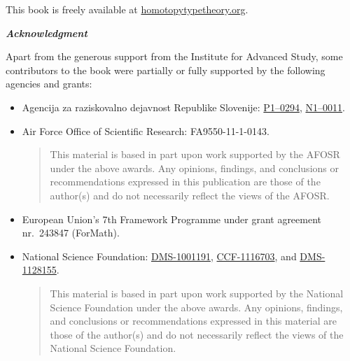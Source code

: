 {\bigskip

\noindent
This book is freely available at \href{http://homotopytypetheory.org/}{homotopytypetheory.org}.

\bigskip

\noindent
\emph{\textbf{\small Acknowledgment}}

\medskip

\noindent
Apart from the generous support from the Institute for Advanced Study, some contributors
to the book were partially or fully supported by the following agencies and grants:
%
\begin{itemize}
\item Agencija za raziskovalno dejavnost Republike Slovenije:  %
\href{http://www.sicris.si/search/prg.aspx?id=6120}{P1--0294},
\href{http://www.sicris.si/search/prj.aspx?id=7109}{N1--0011}.

\item Air Force Office of Scientific Research:
  FA9550-11-1-0143. %
  {
    \setlength{\parskip}{0pt}
    \begin{quote}
      \noindent\scriptsize
      This material is based in part upon work supported by the AFOSR under the above awards.
      Any opinions, findings, and conclusions or recommendations expressed in this publication are those of the author(s) and do not necessarily reflect the views of the AFOSR.
    \end{quote}
  }
\item European Union's 7th Framework Programme under grant agreement nr.\ 243847 (ForMath). %

\item National Science Foundation: 
  \href{http://www.nsf.gov/awardsearch/showAward.do?AwardNumber=1001191}{DMS-1001191}, %
  \href{http://www.nsf.gov/awardsearch/showAward.do?AwardNumber=1116703}{CCF-1116703}, %
  and 
  \href{http://www.nsf.gov/awardsearch/showAward.do?AwardNumber=1128155}{DMS-1128155}. %
  {
    \setlength{\itemsep}{0pt}
    \begin{quote}
      \noindent\scriptsize
      This material is based in part upon work supported by the
      National Science Foundation under the above awards.  Any opinions,
      findings, and conclusions or recommendations expressed in this
      material are those of the author(s) and do not necessarily reflect the
      views of the National Science Foundation.
    \end{quote}
  }
  \end{itemize}

}
\cleartooddpage

